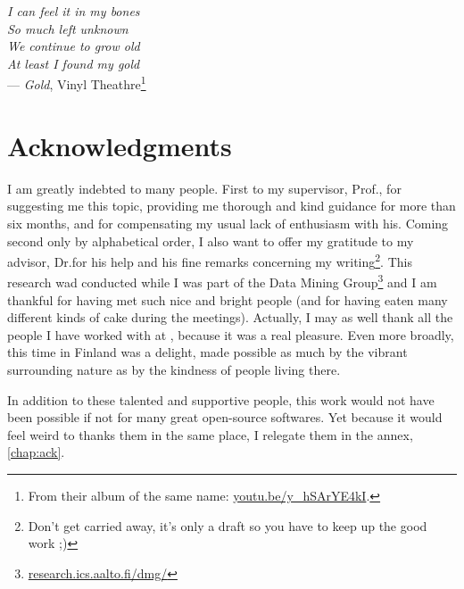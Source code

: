 
\begin{flushright}{\slshape    
		I can feel it in my bones \\
		So much left unknown \\
		We continue to grow old \\
		At least I found my gold
    } \\ \medskip
    --- \emph{Gold}, Vinyl Theathre\footnote{From their album of the same
	    name: \href{https://youtu.be/y_hSArYE4kI?t=2m45s}%
	    {\url{youtu.be/y_hSArYE4kI}}.}
\end{flushright}

\bigskip

\begingroup
\let\clearpage\relax
\let\cleardoublepage\relax
\let\cleardoublepage\relax
\chapter*{Acknowledgments}

I am greatly indebted to many people. First to my supervisor, Prof.\@ \myProf,
for suggesting me this topic, providing me thorough and kind guidance for more
than six months, and for compensating my usual lack of enthusiasm with his.
Coming second only by alphabetical order, I also want to offer my gratitude to
my advisor, Dr.\@ \mySupervisor for his help and his fine remarks concerning my
writing\footnote{Don't get carried away, it's only a draft so you have to keep
up the good work ;)}. This research wad conducted while I was part of the
Data Mining Group\footnote{\href{http://research.ics.aalto.fi/dmg/}%
{\url{research.ics.aalto.fi/dmg/}}} and I am thankful for having met such
nice and bright people (and for having eaten many different kinds of cake
during the meetings). Actually, I may as well thank all the people I have
worked with at \myUni, because it was a real pleasure. Even more broadly, this
time in Finland was a delight, made possible as much by the vibrant surrounding
nature as by the kindness of people living there.

In addition to these talented and supportive people, this work would not have
been possible if not for many great open-source softwares. Yet because it would
feel weird to thanks them in the same place, I relegate them in the annex,
\autoref{chap:ack}.

